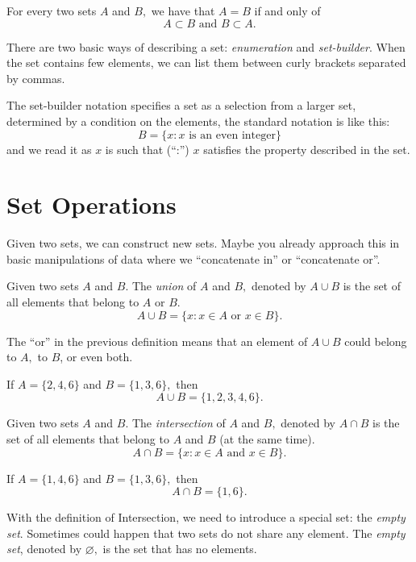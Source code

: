 \documentclass[
	fontsize=10pt, %
	twoside=false, %
	secnumdepth=1, %
]{kaobook}
\begin{document}
\begin{lemma}
For every two sets $A$ and $B,$ we have that $A=B$ if and only of $$A\subset B \mbox{ and } B\subset A.$$
\end{lemma}

There are two basic ways of describing a set: \emph{enumeration} and \emph{set-builder}. When the set contains few elements, we can list them between curly brackets separated by commas.

 The set-builder notation specifies a set as a selection from a larger set, determined by a condition on the elements, the standard notation is like this: $$B=\{x: x\mbox{ is an even integer}\}$$ and we read it as $x$ is such that (``:'') $x$ satisfies the property described in the set.
 

\section{Set Operations}

Given two sets, we can construct new sets. Maybe you already approach this in basic manipulations of data where we ``concatenate in'' or ``concatenate or''.


\begin{definition}[Union]
Given two sets $A$ and $B.$ The \emph{union} of $A$ and $B,$ denoted by $A\cup B$ is the set of all elements that belong to $A$ or $B.$ $$A\cup B=\{x: x\in A \mbox{ or }x\in B\}.$$
\end{definition}

The ``or'' in the previous definition means that an element of $A\cup B$ could belong to $A,$ to $B$, or even both.

\begin{example}
If $A=\{2,4,6\}$ and $B=\{1,3,6\},$ then $$A\cup B=\{1,2,3,4,6\}.$$
\end{example}

\begin{definition}[Intersection]
Given two sets $A$ and $B.$ The \emph{intersection} of $A$ and $B,$ denoted by $A\cap B$ is the set of all elements that belong to $A$ and $B$ (at the same time). $$A\cap B=\{x: x\in A \mbox{ and }x\in B\}.$$
\end{definition}

\begin{example}
If $A=\{1,4,6\}$ and $B=\{1,3,6\},$ then $$A\cap B=\{1,6\}.$$
\end{example}

With the definition of Intersection, we need to introduce a special set: the \emph{empty set}. Sometimes could happen that two sets do not share any element. The \emph{empty set}, denoted by $\varnothing,$ is the set that has no elements.
\end{document}
